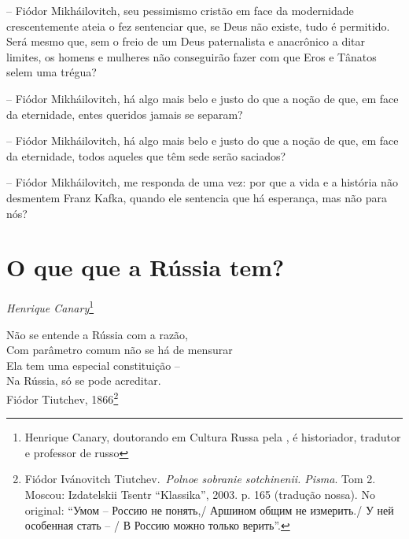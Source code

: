 -- Fiódor Mikháilovitch, seu pessimismo cristão em face da modernidade
crescentemente ateia o fez sentenciar que, se Deus não existe, tudo é
permitido. Será mesmo que, sem o freio de um Deus paternalista e
anacrônico a ditar limites, os homens e mulheres não conseguirão fazer
com que Eros e Tânatos selem uma trégua?

-- Fiódor Mikháilovitch, há algo mais belo e justo do que a noção de
que, em face da eternidade, entes queridos jamais se separam?

-- Fiódor Mikháilovitch, há algo mais belo e justo do que a noção de
que, em face da eternidade, todos aqueles que têm sede serão saciados?

-- Fiódor Mikháilovitch, me responda de uma vez: por que a vida e a
história não desmentem Franz Kafka, quando ele sentencia que há
esperança, mas não para nós?

\chapter*{O que que a Rússia tem?}

\begin{flushright}
\emph{Henrique Canary}\footnote{Henrique Canary, doutorando em Cultura Russa pela , é historiador, tradutor e professor de russo}
\end{flushright}

\begin{flushright}
\small{Não se entende a Rússia com a razão,\\
Com parâmetro comum não se há de mensurar\\
Ela tem uma especial constituição --\\
Na Rússia, só se pode acreditar.\\[5pt]
Fiódor Tiutchev, 1866}\footnote{Fiódor Ivánovitch Tiutchev.~\emph{Polnoe
  sobranie sotchinenii. Pisma}. Tom 2. Moscou: Izdatelskii Tsentr
  ``Klassika'', 2003. p. 165 (tradução nossa). No original: ``Умом --
  Россию не понять,/ Аршином общим не измерить./ У ней особенная стать
  -- / В Россию можно только верить''.}
\end{flushright}


